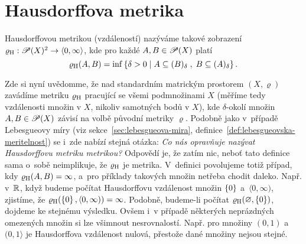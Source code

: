 \section{Hausdorffova metrika}\label{sec:hausdorffova-metrika}

\begin{definition}\label{def:hausdorffova-metrika}
    Hausdorffovou metrikou (vzdáleností) nazýváme takové zobrazení $\varrho_\textup{H}:\mathscr{P}(X)^2 \rightarrow \langle0,\infty\rangle$, kde pro každé $A,B\in\mathscr{P}(X)$ platí
    \[\varrho_\textup{H}(A,B)=\inf\left\{\delta>0\;\middle|\;A\subseteq (B)_\delta\;,\;B\subseteq (A)_\delta\right\}.\]
\end{definition}
Zde si nyní uvědomme, že nad standardním matrickým prostorem $(X,\varrho)$ zavádíme metriku $\varrho_\textup{H}$ pracující se všemi podmnožinami $X$ (měříme tedy vzdálenosti množin v $X$, nikoliv samotných bodů v $X$), kde $\delta$-okolí množin $A,B\in\mathscr{P}(X)$ závisí na volbě původní metriky $\varrho$. Podobně jako v~případě Lebesgueovy míry (viz sekce~\ref{sec:lebesgueova-mira}, definice~\ref{def:lebesgueovska-meritelnost}) se i~zde nabízí stejná otázka: \emph{Co nás opravňuje nazývat Hausdorffovu metriku metrikou?} Odpovědí je, že zatím nic, neboť tato definice sama o~sobě neimplikuje, že $\varrho_\textup{H}$ je metrika. V~definici povolujeme totiž případ, kdy $\varrho_\textup{H}(A,B)=\infty$, a~pro příklady takových množin netřeba chodit daleko. Např. v~$\mathbb{R}$, když budeme počítat Hausdorffovu vzdálenost množin $\left\{0\right\}$ a~$\langle 0,\infty)$, zjistíme, že $\varrho_\textup{H}(\left\{0\right\},\langle 0,\infty))=\infty$. Podobně, budeme-li počítat $\varrho_\textup{H}(\varnothing,\left\{0\right\})$, dojdeme ke stejnému výsledku. Ovšem i~v případě některých neprázdných omezených množin si lze všimnout nesrovnalostí. Např. pro množiny $(0,1)$ a~$(0,1\rangle$ je Hausdorffova vzdálenost nulová, přestože dané množiny nejsou stejné.

